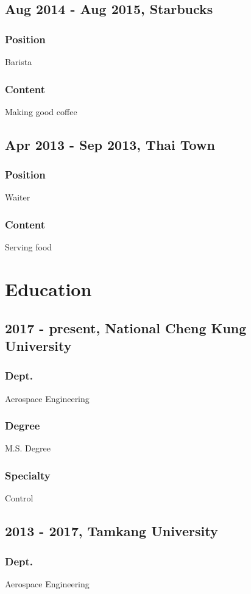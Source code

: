 \documentclass[a4paper,12pt,final]{memoir}
\newcommand{\Sep}{\vspace{1.5em}}
\begin{document}
\subsection{Aug 2014 - Aug 2015, Starbucks}
\subsubsection{Position}
Barista
\subsubsection{Content}
Making good coffee

\subsection{Apr 2013 - Sep 2013, Thai Town}
\subsubsection{Position}
Waiter
\subsubsection{Content}
Serving food

\section{Education}

\subsection{2017 - present, National Cheng Kung University}
\subsubsection{Dept.}
Aerospace Engineering
\subsubsection{Degree}
M.S. Degree
\subsubsection{Specialty}
Control

\subsection{2013 - 2017, Tamkang University}
\subsubsection{Dept.}
Aerospace Engineering
\end{document}
